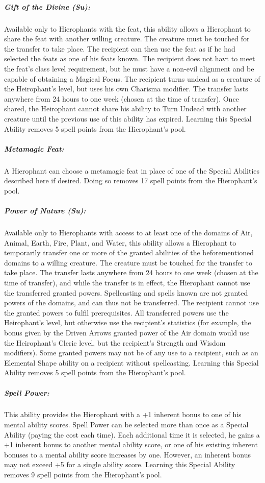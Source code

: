 \subparagraph{Gift of the Divine (Su):}
Available only to Hierophants with the  feat, this ability allows a Hierophant to share the feat with another willing creature.
The creature must be touched for the transfer to take place.
The recipient can then use the feat as if he had selected the feats as one of his feats known.
The recipient does not havt to meet the feat's class level requirement, but he must have a non-evil alignment and be capable of obtaining a Magical Focus.
The recipient turns undead as a creature of the Heirophant's level, but uses his own Charisma modifier.
The transfer lasts anywhere from 24 hours to one week (chosen at the time of transfer). 
Once shared, the Heirophant cannot share his ability to Turn Undead with another creature until the previous use of this ability has expired.
Learning this Special Ability removes 5 spell points from the Hierophant's pool.

\subparagraph{Metamagic Feat:}
A Hierophant can choose a metamagic feat in place of one of the Special Abilities described here if desired.
Doing so removes 17 spell points from the Hierophant's pool.

\subparagraph{Power of Nature (Su):}
Available only to Hierophants with access to at least one of the domains of Air, Animal, Earth, Fire, Plant, and Water, this ability allows a Hierophant to temporarily transfer one or more of the granted abilities of the beforementioned domains to a willing creature. 
The creature must be touched for the transfer to take place.
The transfer lasts anywhere from 24 hours to one week (chosen at the time of transfer), and while the transfer is in effect, the Hierophant cannot use the transferred granted powers.
Spellcasting and spells known are not granted powers of the domains, and can thus not be transferred.
The recipient cannot use the granted powers to fulfil prerequisites.
All transferred powers use the Heirophant's level, but otherwise use the recipient's statistics (for example, the bonus given by the Driven Arrows granted power of the Air domain would use the Heirophant's Cleric level, but the recipient's Strength and Wisdom modifiers).
Some granted powers may not be of any use to a recipient, such as an Elemental Shape ability on a recipient without spellcasting.
Learning this Special Ability removes 5 spell points from the Hierophant's pool.

\subparagraph{Spell Power:}
This ability provides the Hierophant with a +1 inherent bonus to one of his mental ability scores. 
Spell Power can be selected more than once as a Special Ability (paying the cost each time). 
Each additional time it is selected, he gains a +1 inherent bonus to another mental ability score, or one of his existing inherent bonuses to a mental ability score increases by one.
However, an inherent bonus may not exceed +5 for a single ability score.
Learning this Special Ability removes 9 spell points from the Hierophant's pool.

